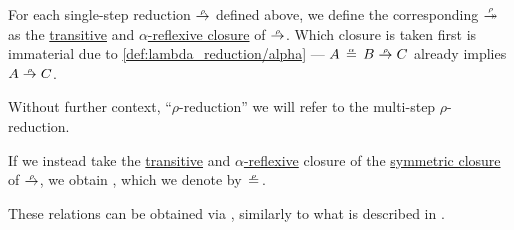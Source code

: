 \begin{definition}
\begin{thmenum}
     For each single-step reduction \( {\rred} \) defined above, we define the corresponding  \( {\rred*} \) as the \hyperref[def:relation_closures/transitive]{transitive} and \hyperref[def:alpha_reflexive_closure]{\( \alpha \)-reflexive closure} of \( {\rred} \). Which closure is taken first is immaterial due to \ref{def:lambda_reduction/alpha} --- \( A \aequiv B \rred C \) already implies \( A \rred C \).

    Without further context, \enquote{\( \rho \)-reduction} we will refer to the multi-step \( \rho \)-reduction.

     If we instead take the
    \hyperref[def:relation_closures/transitive]{transitive} and \hyperref[def:alpha_reflexive_closure]{\( \alpha \)-reflexive} closure of the \hyperref[def:relation_closures/symmetric]{symmetric closure} of \( \rred \), we obtain , which we denote by \( {\equivrel{\rho}} \).
  \end{thmenum}
\end{definition}
\begin{comments}
  \item These relations can be obtained via , similarly to what is described in .
\end{comments}

